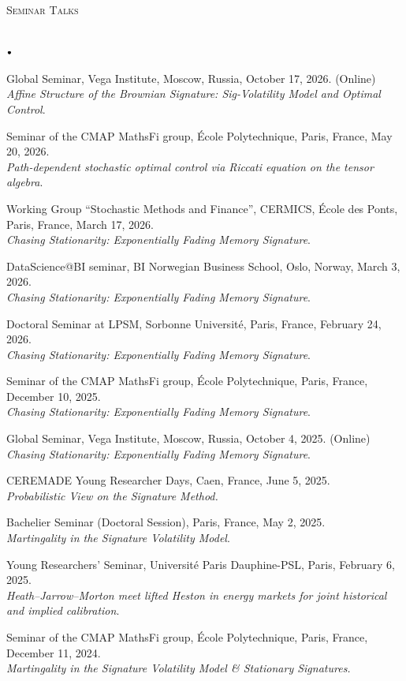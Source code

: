 \documentclass[11pt]{article}
\newcommand{\lineunder}{\vspace*{-8pt} \\ \hspace*{-18pt} \hrulefill \\}
\newcommand{\header}[1]{{\hspace*{-15pt}\vspace*{6pt} \textsc{#1}} \vspace*{-6pt} \lineunder}
\newcommand{\lbt}{\,\begin{picture}(-1,1)(-1,-3)\circle*{3}\end{picture}\ }
\newenvironment{achievements}{
    \begin{list}{$\lbt$}{
        \topsep 0pt
        \itemsep 0pt
        \addtolength{\leftmargin}{-0.1in}
    }
}
{
    \vspace*{4pt}
    \end{list}
}
\begin{document}
\header{Seminar Talks}
\vspace{2mm}
\begin{achievements}
\item Global Seminar, Vega Institute, Moscow, Russia, October 17, 2026. (Online) \\ \textit{Affine Structure of the Brownian Signature: Sig-Volatility Model and Optimal Control}.
\item Seminar of the CMAP MathsFi group, École Polytechnique, Paris, France, May 20, 2026. \\ \textit{Path-dependent stochastic optimal control via  Riccati equation on the tensor algebra}.
\item Working Group ``Stochastic Methods and Finance'', CERMICS, École des Ponts, Paris, France, March 17, 2026. \\ \textit{Chasing Stationarity: Exponentially Fading Memory Signature}.
\item DataScience@BI seminar, BI Norwegian Business School, Oslo, Norway, March 3, 2026. \\ \textit{Chasing Stationarity: Exponentially Fading Memory Signature}.
\item Doctoral Seminar at LPSM, Sorbonne Université, Paris, France, February 24, 2026. \\ \textit{Chasing Stationarity: Exponentially Fading Memory Signature}.
\item Seminar of the CMAP MathsFi group, École Polytechnique, Paris, France, December 10, 2025. \\ \textit{Chasing Stationarity: Exponentially Fading Memory Signature}.
\item Global Seminar, Vega Institute, Moscow, Russia, October 4, 2025. (Online) \\ \textit{Chasing Stationarity: Exponentially Fading Memory Signature}.
\item CEREMADE Young Researcher Days, Caen, France, June 5, 2025. \\ \textit{Probabilistic View on the Signature Method.}
\item Bachelier Seminar (Doctoral Session), Paris, France, May 2, 2025. \\ \textit{Martingality in the Signature Volatility Model}.
\item Young Researchers’ Seminar, Université Paris Dauphine-PSL, Paris, February 6, 2025. \\ \textit{Heath–Jarrow–Morton meet lifted Heston in energy markets for joint historical and implied calibration}.
\item Seminar of the CMAP MathsFi group, École Polytechnique, Paris, France, December 11, 2024. \\ \textit{Martingality in the Signature Volatility Model \& Stationary Signatures.}
\end{achievements}
\end{document}
